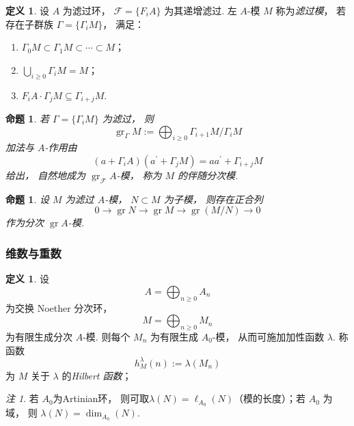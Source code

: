 \documentclass[11pt]{article}
\theoremstyle{plain}
\newtheorem{proposition}[theorem]{命题}
\theoremstyle{definition}
\newtheorem{definition}[theorem]{定义}
\theoremstyle{remark}
\newtheorem{remark}[theorem]{注}
\newcommand{\gr}{\operatorname{gr}}
\begin{document}
\begin{definition}
    设 $A$ 为滤过环，
    $\mathcal{F}=\{F_iA\}$ 为其递增滤过.
    左 $A$-模 $M$ 称为\emph{滤过模}，
    若存在子群族 $\Gamma=\{\Gamma_iM\}$，
    满足：
    \begin{enumerate}
        \item
              $\Gamma_0M\subset \Gamma_1M\subset\cdots\subset M$；
        \item
              $\bigcup_{i\ge0}\Gamma_iM=M$；
        \item
              $F_iA\cdot\Gamma_jM\subseteq\Gamma_{i+j}M$.
    \end{enumerate}
\end{definition}

\begin{proposition}
    若 $\Gamma=\{\Gamma_iM\}$ 为滤过，
    则
    \[
        \gr_\Gamma M
        :=
        \bigoplus_{i\ge0}\Gamma_{i+1}M/\Gamma_iM
    \]
    加法与 $A$-作用由 \[
        (a+\Gamma_iA)(a^\prime+\Gamma_jM)
        =
        aa^\prime+\Gamma_{i+j}M
    \]
    给出，
    自然地成为 $\gr_{\mathcal{F}}A$-模，
    称为 $M$ 的\emph{伴随分次模}.
\end{proposition}


\begin{proposition}
    设 $M$ 为滤过 $A$-模，
    $N\subset M$ 为子模，
    则存在正合列
    \[
        0\to
        \gr N\longrightarrow
        \gr M\longrightarrow
        \gr(M/N)\to0
    \]
    作为分次 $\gr A$-模.
\end{proposition}


\subsubsection{维数与重数}


\begin{definition}
    \label{def:Hilbert 函数}
    设
    \[
        A=\bigoplus_{n\ge0}A_n
    \]
    为交换 Noether 分次环，
    \[
        M=\bigoplus_{n\ge0}M_n
    \]
    为有限生成分次 $A$-模.
    则每个 $M_n$ 为有限生成 $A_0$-模，
    从而可施加加性函数 $\lambda$.
    称函数
    \[
        h_M^\lambda(n)
        :=
        \lambda(M_n)
    \]
    为 $M$ 关于 $\lambda$ 的\emph{Hilbert 函数}；

    \begin{remark}
        若 $A_0$为Artinian环， 则可取$\lambda(N)=\ell_{A_0}(N)$（模的长度）；若 $A_0$ 为域， 则 $\lambda(N)=\dim_{A_0}(N)$.
    \end{remark}
\end{definition}
\end{document}
